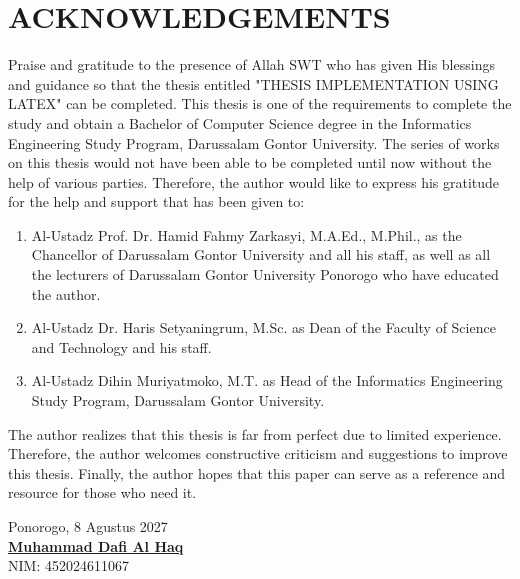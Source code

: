 \chapter*{ACKNOWLEDGEMENTS}

Praise and gratitude to the presence of Allah SWT who has given His blessings and guidance so that the thesis entitled "THESIS IMPLEMENTATION USING LATEX" can be completed. This thesis is one of the requirements to complete the study and obtain a Bachelor of Computer Science degree in the Informatics Engineering Study Program, Darussalam Gontor University. The series of works on this thesis would not have been able to be completed until now without the help of various parties. Therefore, the author would like to express his gratitude for the help and support that has been given to:	%

\begin{enumerate}
	\item Al-Ustadz Prof. Dr. Hamid Fahmy Zarkasyi, M.A.Ed., M.Phil., as the Chancellor of Darussalam Gontor University and all his staff, as well as all the lecturers of Darussalam Gontor University Ponorogo who have educated the author.
	\item Al-Ustadz Dr. Haris Setyaningrum, M.Sc. as Dean of the Faculty of Science and Technology and his staff.
	\item Al-Ustadz Dihin Muriyatmoko, M.T. as Head of the Informatics Engineering Study Program, Darussalam Gontor University.
\end{enumerate}

The author realizes that this thesis is far from perfect due to limited experience. Therefore, the author welcomes constructive criticism and suggestions to improve this thesis. Finally, the author hopes that this paper can serve as a reference and resource for those who need it. 	%

\begin{flushright}
	\begin{minipage}{5cm} 
		Ponorogo, 8 Agustus 2027	%
		\vspace{3cm}\\
		\centering\textbf{\underline{Muhammad Dafi Al Haq}}\\	%
		\centering NIM: 452024611067\\	%
	\end{minipage}
\end{flushright}
